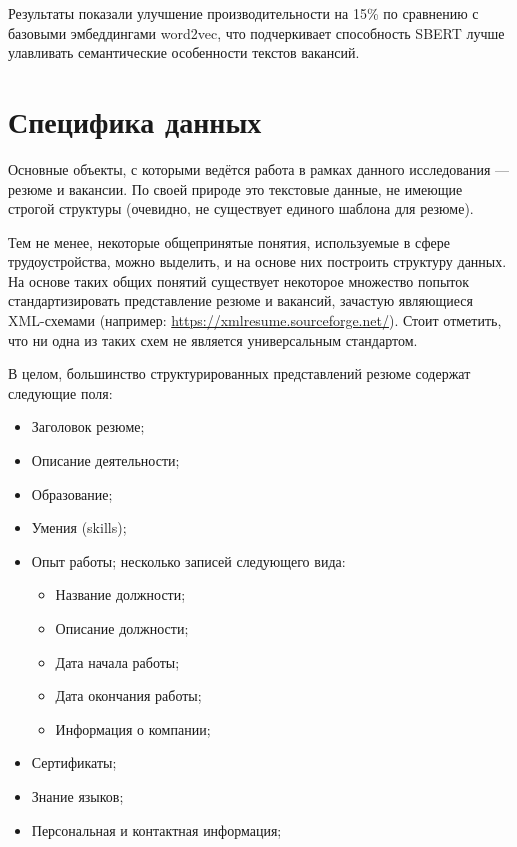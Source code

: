 \documentclass[14pt]{mmcs_article}
\begin{document}
Результаты показали улучшение производительности на 15\% по сравнению с базовыми эмбеддингами word2vec, что подчеркивает способность SBERT лучше улавливать семантические особенности текстов вакансий.


\newpage
\section{Специфика данных}\label{data_specification}

Основные объекты, с которыми ведётся работа в рамках данного исследования --- резюме и вакансии. По своей природе это текстовые данные, не имеющие строгой структуры (очевидно, не существует единого шаблона для резюме).

Тем не менее, некоторые общепринятые понятия, используемые в сфере трудоустройства, можно выделить, и на основе них построить структуру данных. На основе таких общих понятий существует некоторое множество попыток стандартизировать представление резюме и вакансий, зачастую являющиеся XML-схемами (например: \url{https://xmlresume.sourceforge.net/}). Стоит отметить, что ни одна из таких схем не является универсальным стандартом.

В целом, большинство структурированных представлений резюме содержат следующие поля:

\begin{itemize}
  \item Заголовок резюме;
  \item Описание деятельности;
  \item Образование;
  \item Умения (skills);
  \item Опыт работы; несколько записей следующего вида:
        \begin{itemize}
          \item Название должности;
          \item Описание должности;
          \item Дата начала работы;
          \item Дата окончания работы;
          \item Информация о компании;
        \end{itemize}
  \item Сертификаты;
  \item Знание языков;
  \item Персональная и контактная информация;
\end{itemize}
\end{document}
